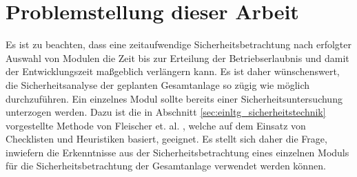 \section{Problemstellung dieser Arbeit}\label{sec:einltg_aufgabe}

Es ist zu beachten, dass eine zeitaufwendige Sicherheitsbetrachtung nach erfolgter Auswahl von Modulen die Zeit bis zur Erteilung der Betriebserlaubnis und damit der Entwicklungszeit ma\ss{}geblich verl\"angern kann. Es ist daher w\"unschenswert, die Sicherheitsanalyse der geplanten Gesamtanlage so z\"ugig wie m\"oglich durchzuf\"uhren. \hfill \newline
Ein einzelnes Modul sollte bereits einer Sicherheitsuntersuchung unterzogen werden. Dazu ist die in Abschnitt \ref{sec:einltg_sicherheitstechnik} vorgestellte Methode von Fleischer et. al. , welche auf dem Einsatz von Checklisten und Heuristiken basiert, geeignet.  Es stellt sich daher die Frage, inwiefern die Erkenntnisse aus der Sicherheitsbetrachtung eines einzelnen Moduls f\"ur die Sicherheitsbetrachtung der Gesamtanlage verwendet werden k\"onnen. 